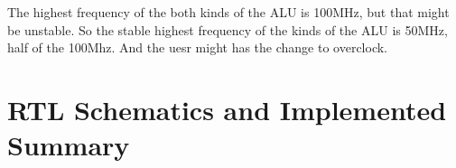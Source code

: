 \documentclass{article}
\begin{document}
      The highest frequency of the both kinds of the ALU is 100MHz, but that might be unstable.
      So the stable highest frequency of the kinds of the ALU is 50MHz, half of the 100Mhz.
      And the uesr might has the change to overclock.

      \section{RTL Schematics and Implemented Summary}
      \label{sec:rsnis}


      
    
\end{document}
